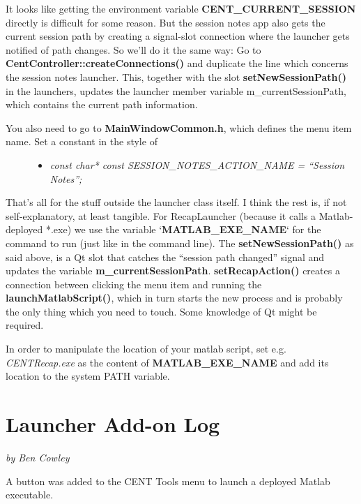 \documentclass[letterpaper,10pt,english]{sphinxmanual}
\begin{document}
It looks like getting the environment variable \textbf{CENT\_CURRENT\_SESSION} directly is difficult for some reason. But the session notes app also gets the current session path by creating a signal-slot connection where the launcher gets notified of path changes. So we'll do it the same way: Go to \textbf{CentController::createConnections()} and duplicate the line which concerns the session notes launcher. This, together with the slot \textbf{setNewSessionPath()} in the launchers, updates the launcher member variable m\_currentSessionPath, which contains the current path information.
\begin{description}
\item[{You also need to go to \textbf{MainWindowCommon.h}, which defines the menu item name. Set a constant in the style of}] \leavevmode\begin{itemize}
\item {} 
\emph{const char* const SESSION\_NOTES\_ACTION\_NAME = ``Session Notes'';}

\end{itemize}

\end{description}

That's all for the stuff outside the launcher class itself. I think the rest is, if not self-explanatory, at least tangible. For RecapLauncher (because it calls a Matlab-deployed *.exe) we use the variable `\textbf{MATLAB\_EXE\_NAME}` for the command to run (just like in the command line). The \textbf{setNewSessionPath()} as said above, is a Qt slot that catches the ``session path changed'' signal and updates the variable \textbf{m\_currentSessionPath}. \textbf{setRecapAction()} creates a connection between clicking the menu item and running the \textbf{launchMatlabScript()}, which in turn starts the new process and is probably the only thing which you need to touch. Some knowledge of Qt might be required.

In order to manipulate the location of your matlab script, set e.g. \emph{CENTRecap.exe} as the content of \textbf{MATLAB\_EXE\_NAME} and add its location to the system PATH variable.


\section{\textbf{Launcher Add-on Log}}
\label{index:launch-log}\label{index:launcher-add-on-log}
\emph{by Ben Cowley}

A button was added to the CENT Tools menu to launch a deployed Matlab executable.
\end{document}
